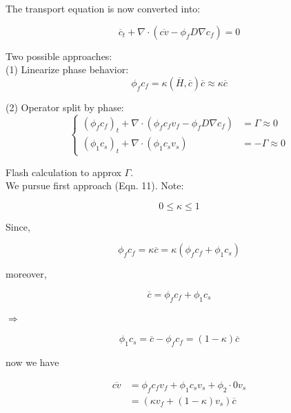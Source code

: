 The transport equation is now converted into:

\begin{equation}
		  \overline{c}_t + \nabla \cdot (\overline{cv} - \phi_f D \nabla c_f)=0
\end{equation}

Two possible approaches:\\

(1) Linearize phase behavior:
\begin{equation}
		  \phi_f c_f = \kappa(\overline{H}, \overline{c}) \overline{c} \approx \kappa \overline{c}
\end{equation}

(2) Operator split by phase:
\begin{equation}
		  \left \{
		  \begin{aligned}
					 (\phi_f c_f)_t + \nabla \cdot (\phi_f c_f v_f - \phi_f D \nabla c_f) &= \Gamma \approx 0 \\
					 (\phi_1 c_s)_t + \nabla \cdot (\phi_1 c_s v_s) &= -\Gamma \approx 0
		  \end{aligned}
		  \right .
\end{equation}

\indent \indent Flash calculation to approx $\Gamma$.\\

We pursue first approach (Eqn. 11). Note:

\begin{equation}
0 \leq \kappa \leq 1
\end{equation}

Since,

\begin{equation*}
		  \phi_f c_f = \kappa \overline{c} = \kappa(\phi_f c_f + \phi_1 c_s)
\end{equation*}

moreover,

\begin{equation*}
		  \overline{c} = \phi_f c_f + \phi_1 c_s
\end{equation*}

$\Rightarrow$

\begin{equation}
		  \phi_1 c_s = \overline{c} - \phi_f c_f = (1-\kappa) \overline{c}
\end{equation}

now we have

\begin{equation*}
		  \begin{aligned}
					 \overline{cv} &= \phi_f c_f v_f + \phi_1 c_s v_s + \phi_2 \cdot 0 v_s\\
					 &= (\kappa v_f + (1-\kappa)v_s)\overline{c}
\end{aligned}
\end{equation*}

